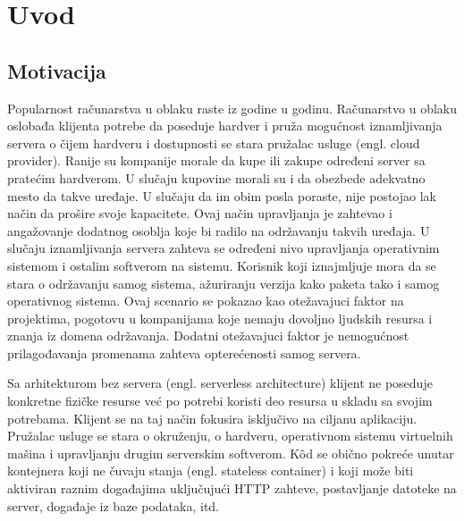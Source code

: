 \documentclass[12pt,oneside]{memoir}
\begin{document}
\frontmatter
\naslovna
\komisija
\apstrakt
\tableofcontents*

\mainmatter

\chapter{Uvod}

\section{Motivacija}
Popularnost računarstva u oblaku raste iz godine u godinu. Računarstvo u oblaku oslobađa klijenta potrebe da poseduje hardver i pruža mogućnost iznamljivanja servera o čijem hardveru i dostupnosti se stara pružalac usluge (engl. cloud provider). Ranije su kompanije morale da kupe ili zakupe određeni server sa pratećim hardverom. U slučaju kupovine morali su i da obezbede adekvatno mesto da takve uređaje. U slučaju da im obim posla poraste, nije postojao lak način da prošire svoje kapacitete. Ovaj način upravljanja je zahtevao i angažovanje dodatnog osoblja koje bi radilo na održavanju takvih uređaja. U slučaju iznamljivanja servera zahteva se određeni nivo upravljanja operativnim sistemom i ostalim softverom na sistemu. Korisnik koji iznajmljuje mora da se stara o održavanju samog sistema, ažuriranju verzija kako paketa tako i samog operativnog sistema. Ovaj scenario se pokazao kao otežavajuci faktor na projektima, pogotovu u kompanijama koje nemaju dovoljno ljudskih resursa i znanja iz domena održavanja. Dodatni otežavajuci faktor je nemogućnost prilagođavanja promenama zahteva opterećenosti samog servera. 

Sa arhitekturom bez servera (engl. serverless architecture) klijent ne poseduje konkretne fizičke resurse već po potrebi koristi deo resursa u skladu sa svojim potrebama. Klijent se na taj način fokusira isključivo na ciljanu aplikaciju. Pružalac usluge se stara o okruženju, o hardveru, operativnom sistemu virtuelnih mašina i upravljanju drugim serverskim softverom. Kôd se obično pokreće unutar kontejnera koji ne čuvaju stanja (engl. stateless container) i koji može biti aktiviran raznim događajima uključujući HTTP zahteve, postavljanje datoteke na server, događaje iz baze podataka, itd.
\end{document}
